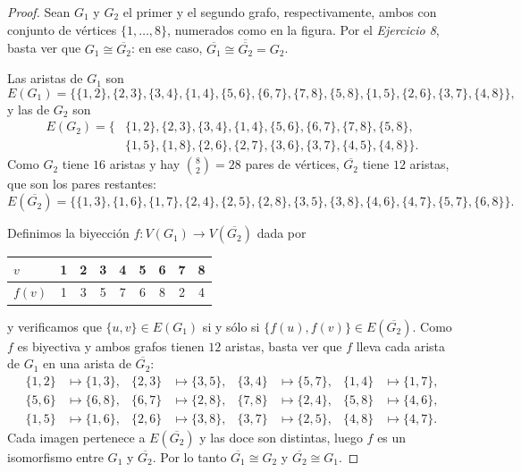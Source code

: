 \begin{proof}
    Sean \( G_1 \) y \( G_2 \) el primer y el segundo grafo, respectivamente, ambos con conjunto de vértices \( \{1,\ldots,8\} \), numerados como en la figura. Por el \emph{Ejercicio 8}, basta ver que \( G_1 \cong \overline{G_2} \): en ese caso, \( \overline{G_1} \cong \overline{\overline{G_2}} = G_2 \).

    Las aristas de \( G_1 \) son \[
        E(G_1) = \bigl \{ \{1,2\}, \{2,3\}, \{3,4\}, \{1,4\}, \{5,6\}, \{6,7\}, \{7,8\}, \{5,8\}, \{1,5\}, \{2,6\}, \{3,7\}, \{4,8\} \bigr \},
    \]
    y las de \( G_2 \) son \[
        \begin{aligned}
            E(G_2) = \bigl \{ & \{1,2\}, \{2,3\}, \{3,4\}, \{1,4\}, \{5,6\}, \{6,7\}, \{7,8\}, \{5,8\},          \\
                              & \{1,5\}, \{1,8\}, \{2,6\}, \{2,7\}, \{3,6\}, \{3,7\}, \{4,5\}, \{4,8\} \bigr \}.
        \end{aligned}
    \]
    Como \( G_2 \) tiene \( 16 \) aristas y hay \( \binom{8}{2} = 28 \) pares de vértices, \( \overline{G_2} \) tiene \( 12 \) aristas, que son los pares restantes: \[
        E\left(\overline{G_2}\right) = \bigl \{ \{1,3\}, \{1,6\}, \{1,7\}, \{2,4\}, \{2,5\}, \{2,8\}, \{3,5\}, \{3,8\}, \{4,6\}, \{4,7\}, \{5,7\}, \{6,8\} \bigr \}.
    \]

    Definimos la biyección \( f : V(G_1) \to V\left(\overline{G_2}\right) \) dada por
    \begin{center}
        \begin{tabular}{@{}lcccccccc@{}}
            \toprule
            \( v \)    & 1 & 2 & 3 & 4 & 5 & 6 & 7 & 8 \\
            \midrule
            \( f(v) \) & 1 & 3 & 5 & 7 & 6 & 8 & 2 & 4 \\
            \bottomrule
        \end{tabular}
    \end{center}
    y verificamos que \( \{u,v\} \in E(G_1) \) si y sólo si \( \{f(u),f(v)\} \in E\left(\overline{G_2}\right) \). Como \( f \) es biyectiva y ambos grafos tienen \( 12 \) aristas, basta ver que \( f \) lleva cada arista de \( G_1 \) en una arista de \( \overline{G_2} \): \[
        \begin{aligned}
            \{1,2\} & \mapsto \{1,3\}, & \{2,3\} & \mapsto \{3,5\}, & \{3,4\} & \mapsto \{5,7\}, & \{1,4\} & \mapsto \{1,7\}, \\
            \{5,6\} & \mapsto \{6,8\}, & \{6,7\} & \mapsto \{2,8\}, & \{7,8\} & \mapsto \{2,4\}, & \{5,8\} & \mapsto \{4,6\}, \\
            \{1,5\} & \mapsto \{1,6\}, & \{2,6\} & \mapsto \{3,8\}, & \{3,7\} & \mapsto \{2,5\}, & \{4,8\} & \mapsto \{4,7\}.
        \end{aligned}
    \]
    Cada imagen pertenece a \( E\left(\overline{G_2}\right) \) y las doce son distintas, luego \( f \) es un isomorfismo entre \( G_1 \) y \( \overline{G_2} \). Por lo tanto \( \overline{G_1} \cong G_2 \) y \( \overline{G_2} \cong G_1 \).
\end{proof}

